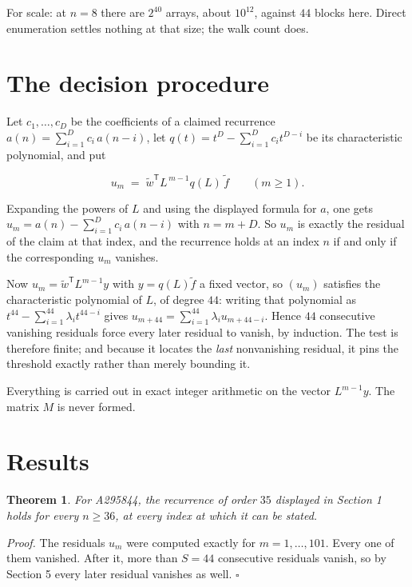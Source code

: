\documentclass[11pt]{article}
\newtheorem{theorem}{Theorem}
\theoremstyle{definition}
\begin{document}
For scale: at $n = 8$ there are $2^{40}$ arrays, about $10^{12}$, against $44$ blocks here. Direct enumeration settles nothing at that size; the walk count does.

\section{The decision procedure}

Let $c_1,\dots,c_D$ be the coefficients of a claimed recurrence $a(n) = \sum_{i=1}^{D} c_i\,a(n-i)$, let $q(t) = t^{D} - \sum_{i=1}^{D} c_i t^{D-i}$ be its characteristic polynomial, and put

\[u_m \;=\; \tilde w^{\mathsf T} L^{\,m-1} q(L)\,\tilde f \qquad (m \ge 1).\]

Expanding the powers of $L$ and using the displayed formula for $a$, one gets $u_m = a(n) - \sum_{i=1}^{D} c_i\,a(n-i)$ with $n = m + D$. So $u_m$ is exactly the residual of the claim at that index, and the recurrence holds at an index $n$ if and only if the corresponding $u_m$ vanishes.

Now $u_m = \tilde w^{\mathsf T} L^{m-1} y$ with $y = q(L)\tilde f$ a fixed vector, so $(u_m)$ satisfies the characteristic polynomial of $L$, of degree $44$: writing that polynomial as $t^{44} - \sum_{i=1}^{44} \lambda_i t^{44-i}$ gives $u_{m+44} = \sum_{i=1}^{44} \lambda_i u_{m+44-i}$. Hence $44$ consecutive vanishing residuals force every later residual to vanish, by induction. The test is therefore finite; and because it locates the {\itshape last} nonvanishing residual, it pins the threshold exactly rather than merely bounding it.

Everything is carried out in exact integer arithmetic on the vector $L^{m-1}y$. The matrix $M$ is never formed.

\section{Results}

\begin{theorem} For A295844, the recurrence of order $35$ displayed in Section 1 holds for every $n \ge 36$, at every index at which it can be stated.\end{theorem}

{\itshape Proof.} The residuals $u_m$ were computed exactly for $m = 1,\dots,101$. Every one of them vanished. After it, more than $S = 44$ consecutive residuals vanish, so by Section 5 every later residual vanishes as well. $\square$
\end{document}
